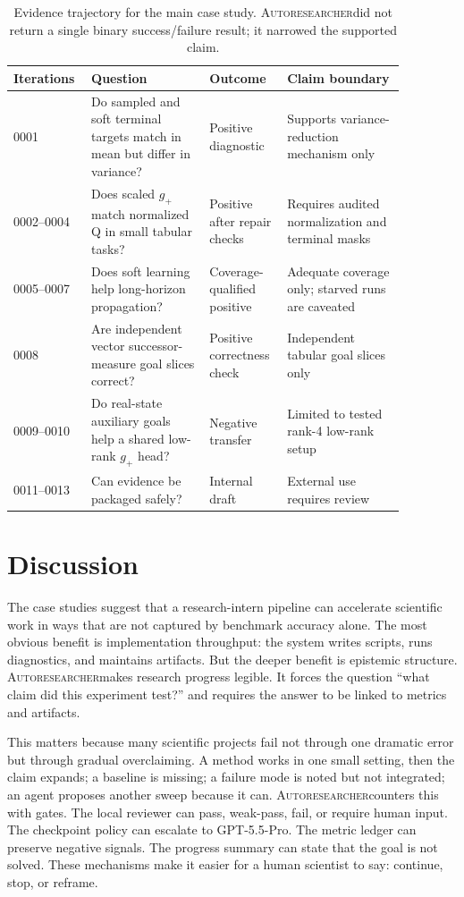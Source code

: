 \documentclass{article}
\newcommand{\sys}{\textsc{Autoresearcher}}
\newcommand{\gptpro}{GPT-5.5-Pro}
\begin{document}
\begin{table}[t]
\centering
\small
\begin{tabular}{p{0.14\linewidth}p{0.28\linewidth}p{0.17\linewidth}p{0.28\linewidth}}
\toprule
Iterations & Question & Outcome & Claim boundary \\
\midrule
0001 & Do sampled and soft terminal targets match in mean but differ in variance? & Positive diagnostic & Supports variance-reduction mechanism only \\
0002--0004 & Does scaled \(g_+\) match normalized Q in small tabular tasks? & Positive after repair checks & Requires audited normalization and terminal masks \\
0005--0007 & Does soft learning help long-horizon propagation? & Coverage-qualified positive & Adequate coverage only; starved runs are caveated \\
0008 & Are independent vector successor-measure goal slices correct? & Positive correctness check & Independent tabular goal slices only \\
0009--0010 & Do real-state auxiliary goals help a shared low-rank \(g_+\) head? & Negative transfer & Limited to tested rank-4 low-rank setup \\
0011--0013 & Can evidence be packaged safely? & Internal draft & External use requires review \\
\bottomrule
\end{tabular}
\caption{Evidence trajectory for the main case study. \sys did not return a single binary success/failure result; it narrowed the supported claim.}
\label{tab:rewardtrajectory}
\end{table}

\section{Discussion}

The case studies suggest that a research-intern pipeline can accelerate scientific work in ways that are not captured by benchmark accuracy alone. The most obvious benefit is implementation throughput: the system writes scripts, runs diagnostics, and maintains artifacts. But the deeper benefit is epistemic structure. \sys makes research progress legible. It forces the question ``what claim did this experiment test?'' and requires the answer to be linked to metrics and artifacts.

This matters because many scientific projects fail not through one dramatic error but through gradual overclaiming. A method works in one small setting, then the claim expands; a baseline is missing; a failure mode is noted but not integrated; an agent proposes another sweep because it can. \sys counters this with gates. The local reviewer can pass, weak-pass, fail, or require human input. The checkpoint policy can escalate to \gptpro. The metric ledger can preserve negative signals. The progress summary can state that the goal is not solved. These mechanisms make it easier for a human scientist to say: continue, stop, or reframe.
\end{document}
